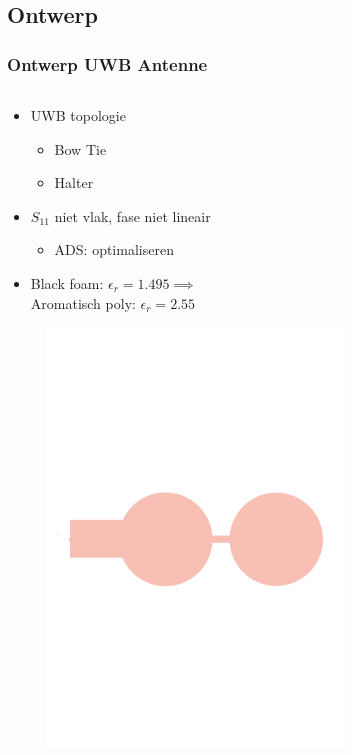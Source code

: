 \documentclass{beamer}
\begin{document}
\subsection{Ontwerp}
  \begin{frame}
  \frametitle{Ontwerp UWB Antenne}
  \begin{columns}[c]
  \begin{column}{0.5\textwidth}
  \begin{itemize}
        \item UWB topologie
         \begin{itemize}
            \item Bow Tie
            \item Halter 
           \end{itemize}
        \item $S_{11}$ niet vlak, fase niet lineair
        \begin{itemize}
          \item ADS: optimaliseren
        \end{itemize}
        \item Black foam: $\epsilon_r = 1.495 \implies$ \\ Aromatisch poly: $\epsilon_r = 2.55$ 
      \end{itemize}
    \begin{figure}[H]
    \includegraphics[width=0.7\textwidth]{images/halter.pdf}
    \end{figure}
  \end{column}


\end{columns}
\end{frame}
\end{document}
